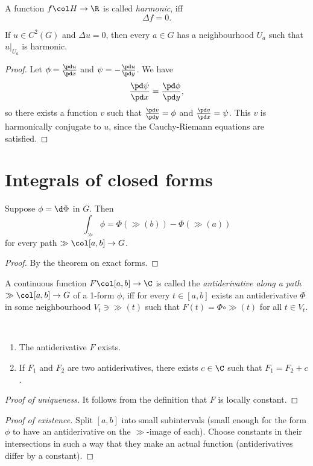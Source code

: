 \begin{definition}
  A function $f \col H \to \R$ is called \emph{harmonic}, iff
  $$ \Delta f = 0. $$
\end{definition}

\begin{theorem}
  If $u \in C^2(G)$ and $\Delta u = 0$, then every $a \in G$ has a neighbourhood $U_a$ such that $u|_{U_a}$ is harmonic.
\end{theorem}

\begin{proof}
  Let $\phi = \frac{\pd u}{\pd x}$ and $\psi = -\frac{\pd u}{\pd y}$. We have
  $$ \frac{\pd \psi}{\pd x} = \frac{\pd \phi}{\pd y}, $$
  so there exists a function $v$ such that $\frac{\pd v}{\pd y} = \phi$ and $\frac{\pd v}{\pd x} = \psi$. This $v$ is harmonically conjugate to $u$, since the Cauchy-Riemann equations are satisfied.
\end{proof}

\section{Integrals of closed forms}

\begin{lemma}
  Suppose $\phi = \d \Phi$ in $G$. Then
  $$ \int_\gg \phi = \Phi(\gg(b)) - \Phi(\gg(a)) $$
  for every path $\gg \col [a, b] \to G$.
\end{lemma}

\begin{proof}
  By the theorem on exact forms.
\end{proof}

\begin{definition}
  A continuous function $F \col [a, b] \to \C$ is called the \emph{antiderivative along a path} $\gg \col [a, b] \to G$ of a 1-form $\phi$, iff for every $t \in [a, b]$ exists an antiderivative $\Phi$ in some neighbourhood $V_t \ni \gg(t)$ such that $F(t) = \Phi \circ \gg(t)$ for all $t \in V_t$.
\end{definition}

\begin{theorem}
  ~\begin{enumerate}
    \item The antiderivative $F$ exists.
    \item If $F_1$ and $F_2$ are two antiderivatives, there exists $c \in \C$ such that $F_1 = F_2 + c$.
  \end{enumerate}  
\end{theorem}

\begin{proof}[Proof of uniqueness]
  It follows from the definition that $F$ is locally constant.
\end{proof}

\begin{proof}[Proof of existence]
  Split $[a, b]$ into small subintervals (small enough for the form $\phi$ to have an antiderivative on the $\gg$-image of each). Choose constants in their intersections in such a way that they make an actual function (antiderivatives differ by a constant).
\end{proof}
